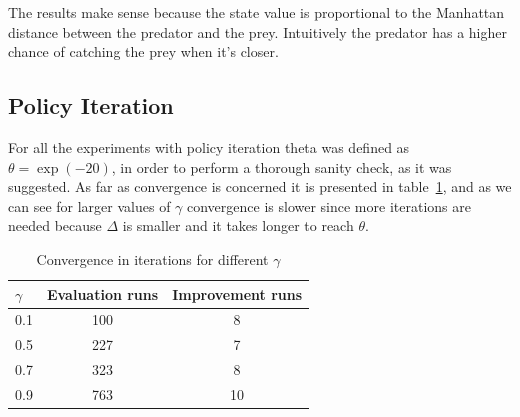 \documentclass[paper=a4, fontsize=11pt]{scrartcl}
\numberwithin{equation}{section}		%
\numberwithin{figure}{section}			%
\numberwithin{table}{section}				%
\begin{document}
The results make sense because the state value is proportional to the Manhattan distance between the predator and the prey. Intuitively the predator has a higher chance of catching the prey when it's closer.



\subsection{Policy Iteration}
For all the experiments with policy iteration theta was defined as $\theta = \exp(-20)$, in order to perform a thorough sanity check, as it was suggested. As far as convergence is concerned it is presented in table~\ref{convPIter}, and as we can see for larger values of $\gamma$ convergence is slower since more iterations are needed because $\Delta$ is smaller and it takes longer to reach $\theta$.

\begin{table}[H]
\caption{Convergence in iterations for different $\gamma$}
\centering
\begin{tabular}{|l||c|c|}
\hline
$\gamma$&Evaluation runs&Improvement runs\\
\hline
0.1&100&8\\
\hline
0.5&227&7\\
\hline
0.7&323&8\\
\hline
0.9&763&10\\
\hline
\end{tabular}
\label{convPIter}
\end{table}
\end{document}
